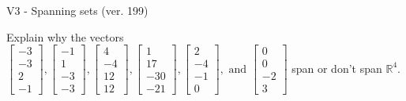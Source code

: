 \begin{exercise}
  \begin{exerciseTitle}V3 - Spanning sets (ver. 199)\end{exerciseTitle}
  \begin{exerciseStatement}
    Explain why the vectors \(\left[\begin{array}{r}
-3 \\
-3 \\
2 \\
-1
\end{array}\right] , \left[\begin{array}{r}
-1 \\
1 \\
-3 \\
-3
\end{array}\right] , \left[\begin{array}{r}
4 \\
-4 \\
12 \\
12
\end{array}\right] , \left[\begin{array}{r}
1 \\
17 \\
-30 \\
-21
\end{array}\right] , \left[\begin{array}{r}
2 \\
-4 \\
-1 \\
0
\end{array}\right] , \text{ and } \left[\begin{array}{r}
0 \\
0 \\
-2 \\
3
\end{array}\right]\) span or don't span \(\mathbb{R}^4\). 
	



\end{exerciseStatement}
\end{exercise}
